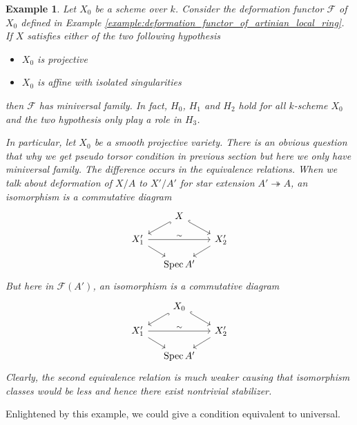 \documentclass{ctexart}
\newtheorem{example}{Example}[section]
\newcommand{\spec}{\operatorname{Spec}}
\begin{document}
\begin{example}
    Let $X_{0}$ be a scheme over $k$.
    Consider the deformation functor $\mathcal{F}$ of $X_{0}$ defined in Example \ref{example:deformation_functor_of_artinian_local_ring}.
    If $X$ satisfies either of the two following hypothesis
    \begin{itemize}
        \item $X_{0}$ is projective
        \item $X_{0}$ is affine with isolated singularities
    \end{itemize}
    then $\mathcal{F}$ has miniversal family.
    In fact, $H_{0}$, $H_{1}$ and $H_{2}$ hold for all $k$-scheme $X_{0}$ and the two hypothesis only play a role in $H_{3}$.
    \par
    In particular, let $X_{0}$ be a smooth projective variety.
    There is an obvious question that why we get pseudo torsor condition in previous section but here we only have miniversal family.
    The difference occurs in the equivalence relations.
    When we talk about deformation of $X/A$ to $X'/A'$ for star extension $A' \twoheadrightarrow A$,
    an isomorphism is a commutative diagram
    \begin{equation}
        \begin{tikzcd}[sep = small]
            & X \arrow[dr, hookrightarrow] \arrow[dl, hookrightarrow] & \\
            X_{1}' \arrow[rr, "\sim"] \arrow[dr] &&
            X_{2}' \arrow[dl] \\
            & \spec A' &
        \end{tikzcd}
    \end{equation}
    But here in $\mathcal{F}(A')$, an isomorphism is a commutative diagram
    \begin{equation}
        \begin{tikzcd}[sep = small]
            & X_{0} \arrow[dr, hookrightarrow] \arrow[dl, hookrightarrow] & \\
            X_{1}' \arrow[rr, "\sim"] \arrow[dr] &&
            X_{2}' \arrow[dl] \\
            & \spec A' &
        \end{tikzcd}
    \end{equation}
    Clearly, the second equivalence relation is much weaker causing that isomorphism classes would be less and hence there exist nontrivial stabilizer.
\end{example}
Enlightened by this example, we could give a condition equivalent to universal.
\end{document}
